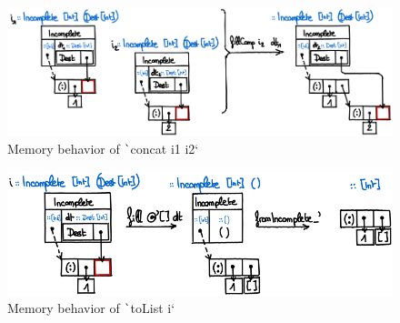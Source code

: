 \documentclass[english]{jflart}
\begin{document}
\begin{figure}[t]\centering
  \includegraphics[width=14cm]{dlist-concat.png}
  \caption{Memory behavior of \texttt`concat i1 i2`}
  \label{fig:schema-dlist-concat}
\end{figure}

\begin{figure}[t]\centering
  \includegraphics[width=11.5cm]{dlist-toList.png}
  \caption{Memory behavior of \texttt`toList i`}
  \label{fig:schema-dlist-toList}
\end{figure}
\end{document}
